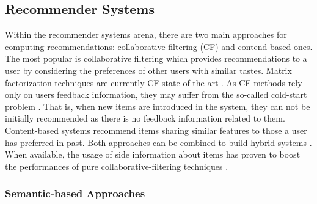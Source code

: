 \subsection{Recommender Systems}
\label{sec:SOA:mir:recommendation}

Within the recommender systems arena, there are two main approaches for computing recommendations: collaborative filtering (CF) and contend-based ones.
The most popular is collaborative filtering which provides recommendations to a user by considering the preferences of other users with similar tastes. 
Matrix factorization techniques are currently CF state-of-the-art \citep{Koren2009}. 
As CF methods rely only on users feedback information, they may suffer from the so-called cold-start problem \citep{Saveski2014}. That is, when new items are introduced in the system, they can not be initially recommended as there is no feedback information related to them.
Content-based
systems recommend items sharing similar features to those a user has preferred in past. 
Both approaches can be combined to build hybrid systems \cite{Burke2002}. 
When available, the usage of side information about items has proven to boost the performances of pure collaborative-filtering techniques \cite{Ning12}. %



\subsubsection{Semantic-based Approaches}
\label{sec:SOA:mir:recommendation:semantic}

